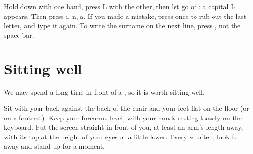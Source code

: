 \begin{example}\label{ex:g2:keyboard-and-mouse:capital}
Hold  down with one hand, press L with the other, then let go of
: a capital L appears. Then press i, n, a. If you made a mistake,
press  once to rub out the last letter, and type it again. To
write the surname on the next line, press , not the space bar.
\end{example}

\section{Sitting well}

We may spend a long time in front of a , so it is worth sitting well.

\begin{method}\label{met:g2:keyboard-and-mouse:posture}
Sit with your back against the back of the chair and your feet flat on the
floor (or on a footrest). Keep your forearms level, with your hands resting
loosely on the keyboard. Put the screen straight in front of you, at least an
arm's length away, with its top at the height of your eyes or a little lower.
Every so often, look far away and stand up for a moment.
\end{method}

